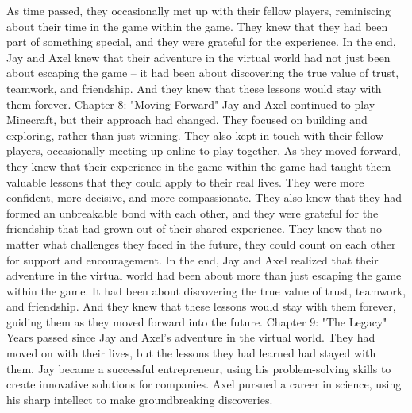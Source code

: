 \documentclass{book}%
\begin{document}
\newline%
As time passed, they occasionally met up with their fellow players, reminiscing about their time in the game within the game. They knew that they had been part of something special, and they were grateful for the experience.\newline%
\newline%
In the end, Jay and Axel knew that their adventure in the virtual world had not just been about escaping the game – it had been about discovering the true value of trust, teamwork, and friendship. And they knew that these lessons would stay with them forever.%
Chapter 8: "Moving Forward"\newline%
\newline%
Jay and Axel continued to play Minecraft, but their approach had changed. They focused on building and exploring, rather than just winning. They also kept in touch with their fellow players, occasionally meeting up online to play together.\newline%
\newline%
As they moved forward, they knew that their experience in the game within the game had taught them valuable lessons that they could apply to their real lives. They were more confident, more decisive, and more compassionate.\newline%
\newline%
They also knew that they had formed an unbreakable bond with each other, and they were grateful for the friendship that had grown out of their shared experience. They knew that no matter what challenges they faced in the future, they could count on each other for support and encouragement.\newline%
\newline%
In the end, Jay and Axel realized that their adventure in the virtual world had been about more than just escaping the game within the game. It had been about discovering the true value of trust, teamwork, and friendship. And they knew that these lessons would stay with them forever, guiding them as they moved forward into the future.%
Chapter 9: "The Legacy"\newline%
\newline%
Years passed since Jay and Axel's adventure in the virtual world. They had moved on with their lives, but the lessons they had learned had stayed with them.\newline%
\newline%
Jay became a successful entrepreneur, using his problem{-}solving skills to create innovative solutions for companies. Axel pursued a career in science, using his sharp intellect to make groundbreaking discoveries.\newline%
\end{document}
